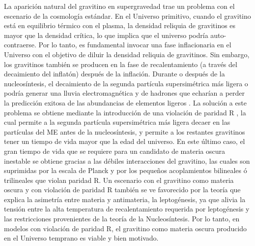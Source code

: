 La aparición natural del gravitino en supergravedad trae un problema
con el escenario de la cosmología estándar. En el Universo primitivo,
cuando el gravitino está en equilibrio térmico con el plasma, la
densidad reliquia de gravitinos es mayor que la densidad crítica, lo
que implica que el universo podría auto-contraerse. Por lo tanto, es
fundamental invocar una fase inflacionaria en el Universo con el
objetivo de diluir la densidad reliquia de gravitinos. Sin embargo,
los gravitinos también se producen en la fase de recalentamiento (a
través del decaimiento del inflatón) después de la inflación. Durante
o después de la nucleosíntesis, el decaimiento de la segunda partícula
supersimétrica más ligera o  podría
generar una lluvia electromagnética y de hadrones que echarían a
perder la predicción exitosa de las abundancias de elementos ligeros
\cite{Sarkar:1995dd}. La solución a este problema se obtiene mediante
la introducción de una violación de paridad R
\cite{Buchmuller:2007ui}, la cual permite a la segunda partícula
supersimétrica más ligera decaer en las partículas del ME
antes de la nucleosíntesis, y permite a los restantes gravitinos tener
un tiempo de vida mayor que la edad del universo. En este último caso,
el gran tiempo de vida que se requiere para un candidato de materia
oscura inestable se obtiene gracias a las débiles interacciones del
gravitino, las cuales son suprimidas por la escala de Planck y por los
pequeños acoplamientos bilineales ó trilineales que violan paridad
R. Un escenario con el gravitino como materia oscura y con violación
de paridad R también se ve favorecido por la teoría que explica la
asimetría entre materia y antimateria, la leptogénesis, ya que alivia
la tensión entre la alta temperatura de recalentamiento requerida por
leptogénesis y las restricciones provenientes de la teoría de la
Nucleosíntesis. Por lo tanto, en modelos con violación de
paridad R, el gravitino como materia oscura producido en el Universo
temprano es viable y bien motivado.

